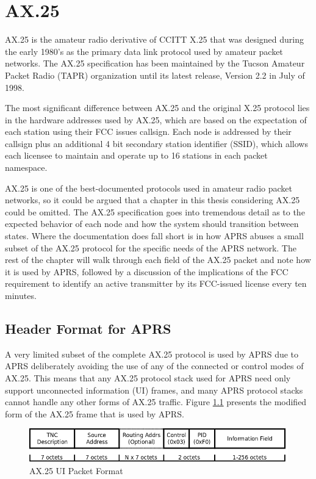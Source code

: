 \chapter{AX.25}

AX.25 is the amateur radio derivative of CCITT X.25 that was designed during the early 1980's 
as the primary data link protocol used by amateur packet networks.
The AX.25 specification has been maintained by the Tucson Amateur Packet Radio (TAPR) 
organization until its latest release, Version 2.2 in July of 1998. 

The most significant difference between AX.25 and the original X.25 protocol lies
in the hardware addresses used by AX.25, which are based on the expectation of
each station using their FCC issues callsign. 
Each node is addressed by their callsign plus an additional 4 bit 
secondary station identifier (SSID), which allows each licensee to maintain and operate 
up to 16 stations in each packet namespace.

AX.25 is one of the best-documented protocols used in amateur radio packet networks,
so it could be argued that a chapter in this thesis considering AX.25 could be omitted.
The AX.25 specification goes into tremendous detail as to the expected behavior of each
node and how the system should transition between states.
Where the documentation does fall short is in how APRS abuses a small subset of 
the AX.25 protocol for the specific needs of the APRS network.
The rest of the chapter will walk through each field of the AX.25 packet and
note how it is used by APRS, followed by a discussion of the implications of the FCC
requirement to identify an active transmitter by its FCC-issued license every ten minutes.

\section{Header Format for APRS}

A very limited subset of the complete AX.25 protocol is used by APRS due to APRS 
deliberately avoiding the use of any of the connected or control modes of AX.25. This 
means that any AX.25 protocol stack used for APRS need only support unconnected information (UI)
frames, and many APRS protocol stacks cannot handle any other forms of AX.25 traffic. 
Figure \ref{fig:ax25uiformat} presents the modified form of the AX.25 frame that is used
by APRS.

\begin{figure}
	\centering
	\includegraphics[width=1.0\textwidth]{src/dia/ax25ui}
	\caption{AX.25 UI Packet Format}
	\label{fig:ax25uiformat}
\end{figure}

